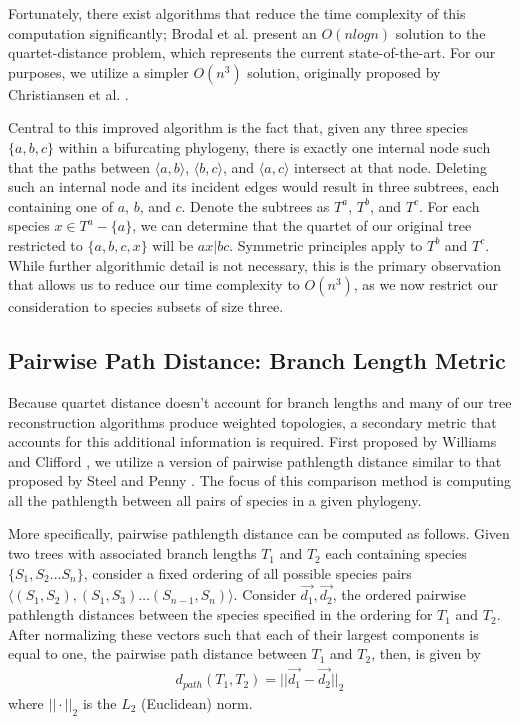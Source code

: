 \documentclass[10pt,twocolumn]{article}
\begin{document}
Fortunately, there exist algorithms that reduce the time complexity of this computation significantly; Brodal et al. \cite{brodal2004computing} present an $O(nlogn)$ solution to the quartet-distance problem, which represents the current state-of-the-art. For our purposes, we utilize a simpler $O(n^3)$ solution, originally proposed by Christiansen et al. \cite{christiansen2005computing}.

Central to this improved algorithm is the fact that, given any three species $\{a,b,c\}$ within a bifurcating phylogeny, there is exactly one internal node such that the paths between $\langle a, b \rangle$, $\langle b, c \rangle$, and $\langle a, c \rangle$ intersect at that node. Deleting such an internal node and its incident edges would result in three subtrees, each containing one of $a$, $b$, and $c$. Denote the subtrees as $T^a$, $T^b$, and $T^c$. For each species $x \in T^a - \{a\}$, we can determine that the quartet of our original tree restricted to $\{a,b,c,x\}$ will be $ax|bc$. Symmetric principles apply to $T^b$ and $T^c$. While further algorithmic detail is not necessary, this is the primary observation that allows us to reduce our time complexity to $O(n^3)$, as we now restrict our consideration to species subsets of size three.

\subsection*{Pairwise Path Distance: Branch Length Metric}
Because quartet distance doesn't account for branch lengths and many of our tree reconstruction algorithms produce weighted topologies, a secondary metric that accounts for this additional information is required. First proposed by Williams and Clifford \cite{williams1971comparison}, we utilize a version of pairwise pathlength distance similar to that proposed by Steel and Penny \cite{steel1993distributions}. The focus of this comparison method is computing all the pathlength between all pairs of species in a given phylogeny.

More specifically, pairwise pathlength distance can be computed as follows. Given two trees with associated branch lengths $T_1$ and $T_2$ each containing species $\{S_1, S_2 \ldots S_n\}$, consider a fixed ordering of all possible species pairs $\langle (S_1, S_2), (S_1, S_3) \ldots (S_{n-1}, S_n) \rangle$. Consider $\vec{d_1}, \vec{d_2}$, the ordered pairwise pathlength distances between the species specified in the ordering for $T_1$ and $T_2$. After normalizing these vectors such that each of their largest components is equal to one, the pairwise path distance between $T_1$ and $T_2$, then, is given by
\begin{align}
  d_{path}(T_1, T_2) = ||\vec{d_1} - \vec{d_2}||_2
\end{align}
where $||\cdot||_2$ is the $L_2$ (Euclidean) norm.
\end{document}
